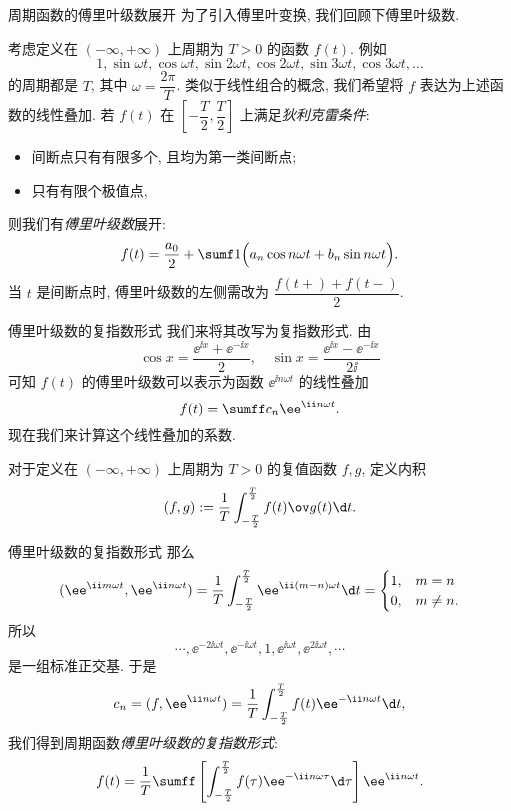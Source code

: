 \begin{frame}{周期函数的傅里叶级数展开}
	\onslide<+->
	为了引入傅里叶变换, 我们回顾下傅里叶级数.

	\onslide<+->
	考虑定义在 $(-\infty,+\infty)$ 上周期为 $T>0$ 的函数 $f(t)$.
	\onslide<+->
	例如
	\[
		1,\sin{\omega t},\cos{\omega t},
		\sin{2\omega t},\cos{2\omega t},
		\sin{3\omega t},\cos{3\omega t},\dots
	\]
	的周期都是 $T$, 其中 $\omega=\dfrac{2\pi}T$.
	\onslide<+->
	类似于线性组合的概念, 我们希望将 $f$ 表达为上述函数的线性叠加.
	\onslide<+->
	若 $f(t)$ 在 $\left[-\dfrac T2,\dfrac T2\right]$ 上满足\emph{狄利克雷条件}:
	\begin{itemize}
		\item 间断点只有有限多个, 且均为第一类间断点;
		\item 只有有限个极值点,
	\end{itemize}
	\onslide<+->
	则我们有\emph{傅里叶级数}展开:
	\[
		f(t)=\frac{a_0}2+\sumf1 \Bigl(a_n\cos n\omega t+b_n \sin n\omega t\Bigr).
	\]
	\onslide<+->
	当 $t$ 是间断点时, 傅里叶级数的左侧需改为 $\dfrac{f(t+)+f(t-)}2$.
\end{frame}


\begin{frame}{傅里叶级数的复指数形式}
	\onslide<+->
	我们来将其改写为复指数形式.
	\onslide<+->
	由
	\[
		\cos x=\frac{\ee^{\ii x}+\ee^{-\ii x}}2,\quad \sin x=\frac{\ee^{\ii x}-\ee^{-\ii x}}{2\ii }
	\]
	\onslide<+->
	可知 $f(t)$ 的傅里叶级数可以表示为函数 $\ee^{\ii n\omega t}$ 的线性叠加
	\[
		f(t)=\sumff c_n\ee^{\ii n\omega t}.
	\]
	\onslide<+->
	现在我们来计算这个线性叠加的系数.

	\onslide<+->
	对于定义在 $(-\infty,+\infty)$ 上周期为 $T>0$ 的\alert{复值}函数 $f,g$, 定义内积
	\[
		(f,g):=\frac1T\int_{-\frac T2}^{\frac T2} f(t)\ov g(t)\d t.
	\]
\end{frame}


\begin{frame}{傅里叶级数的复指数形式}
	\onslide<+->
	那么
	\[
		(\ee^{\ii m\omega t},\ee^{\ii n\omega t})
		=\frac1T\int_{-\frac T2}^{\frac T2} \ee^{\ii (m-n)\omega t}\d t=\begin{cases}
			1,&m=n\\
			0,&m\neq n.
		\end{cases}
	\]
	\onslide<+->
	所以
	\[
		\cdots,\ee^{-2\ii \omega t},\ee^{-\ii \omega t},1,\ee^{\ii \omega t},\ee^{2\ii \omega t},\cdots
	\]
	是一组标准正交基.
	\onslide<+->
	于是
	\[
		c_n=(f,\ee^{\ii n\omega t})=\frac 1T\int_{-\frac T2}^{\frac T2}f(t)\ee^{-\ii n\omega t} \d t,
	\]
	\onslide<+->
	我们得到周期函数\emph{傅里叶级数的复指数形式}:
	\[
		f(t)=\frac 1T\sumff\left[\int_{-\frac T2}^{\frac T2}f(\tau)\ee^{-\ii n\omega\tau} \d\tau\right] \ee^{\ii n\omega t}.
	\]
\end{frame}


